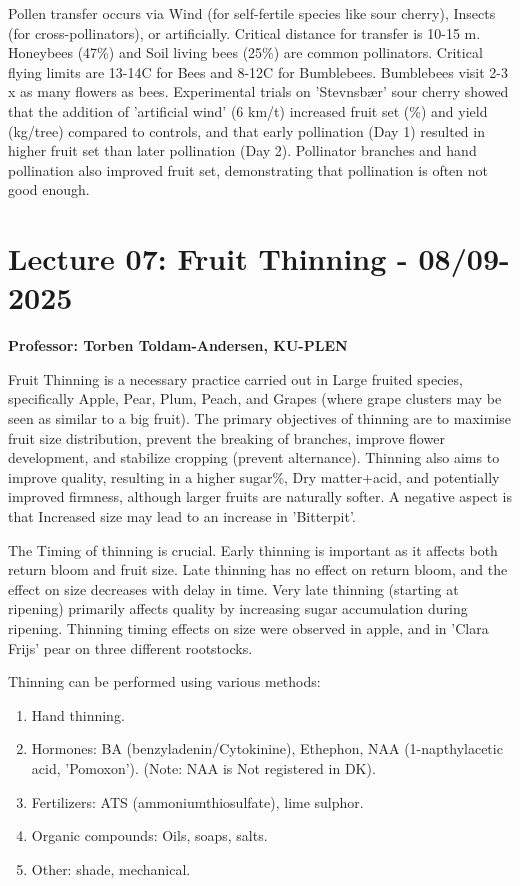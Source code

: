 \vspace{0.5em}
Pollen transfer occurs via Wind (for self-fertile species like sour cherry), Insects (for cross-pollinators), or artificially. Critical distance for transfer is 10-15 m. Honeybees (47\%) and Soil living bees (25\%) are common pollinators. Critical flying limits are 13-14\textdegree C for Bees and 8-12\textdegree C for Bumblebees. Bumblebees visit 2-3 x as many flowers as bees. Experimental trials on 'Stevnsbær' sour cherry showed that the addition of 'artificial wind' (6 km/t) increased fruit set (\%) and yield (kg/tree) compared to controls, and that early pollination (Day 1) resulted in higher fruit set than later pollination (Day 2). Pollinator branches and hand pollination also improved fruit set, demonstrating that pollination is often not good enough.


\section{Lecture 07: Fruit Thinning - 08/09-2025}
\textbf{Professor: Torben Toldam-Andersen, KU-PLEN}

\vspace{1em}
Fruit Thinning is a necessary practice carried out in Large fruited species, specifically Apple, Pear, Plum, Peach, and Grapes (where grape clusters may be seen as similar to a big fruit). The primary objectives of thinning are to maximise fruit size distribution, prevent the breaking of branches, improve flower development, and stabilize cropping (prevent alternance). Thinning also aims to improve quality, resulting in a higher sugar\%, Dry matter+acid, and potentially improved firmness, although larger fruits are naturally softer. A negative aspect is that Increased size may lead to an increase in 'Bitterpit'.

\vspace{0.5em}
The Timing of thinning is crucial. Early thinning is important as it affects both return bloom and fruit size. Late thinning has no effect on return bloom, and the effect on size decreases with delay in time. Very late thinning (starting at ripening) primarily affects quality by increasing sugar accumulation during ripening. Thinning timing effects on size were observed in apple, and in 'Clara Frijs' pear on three different rootstocks.

\vspace{0.5em}
Thinning can be performed using various methods: 

\begin{enumerate} 
    \item Hand thinning. 
    \item Hormones: BA (benzyladenin/Cytokinine), Ethephon, NAA (1-napthylacetic acid, 'Pomoxon'). (Note: NAA is Not registered in DK). 
    \item Fertilizers: ATS (ammoniumthiosulfate), lime sulphor. 
    \item Organic compounds: Oils, soaps, salts. 
    \item Other: shade, mechanical. 
\end{enumerate} 

